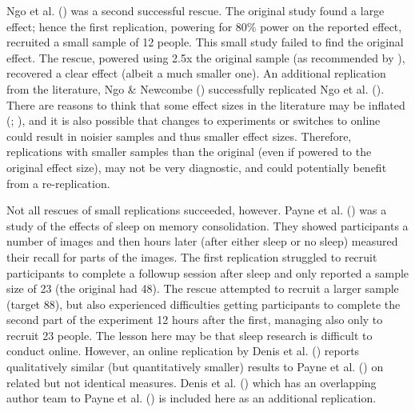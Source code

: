 \documentclass[
  english,
  a4paper,
]{article}
\begin{document}
Ngo et al. () was a second successful rescue.
The original study found a large effect; hence the first replication, powering for 80\% power on the reported effect, recruited a small sample of 12 people.
This small study failed to find the original effect.
The rescue, powered using 2.5x the original sample (as recommended by ), recovered a clear effect (albeit a much smaller one).
An additional replication from the literature, Ngo \& Newcombe () successfully replicated Ngo et al. ().
There are reasons to think that some effect sizes in the literature may be inflated (; ), and it is also possible that changes to experiments or switches to online could result in noisier samples and thus smaller effect sizes.
Therefore, replications with smaller samples than the original (even if powered to the original effect size), may not be very diagnostic, and could potentially benefit from a re-replication.

Not all rescues of small replications succeeded, however.
Payne et al. () was a study of the effects of sleep on memory consolidation.
They showed participants a number of images and then hours later (after either sleep or no sleep) measured their recall for parts of the images.
The first replication struggled to recruit participants to complete a followup session after sleep and only reported a sample size of 23 (the original had 48).
The rescue attempted to recruit a larger sample (target 88), but also experienced difficulties getting participants to complete the second part of the experiment 12 hours after the first, managing also only to recruit 23 people.
The lesson here may be that sleep research is difficult to conduct online.
However, an online replication by Denis et al. () reports qualitatively similar (but quantitatively smaller) results to Payne et al. () on related but not identical measures.
Denis et al. () which has an overlapping author team to Payne et al. () is included here as an additional replication.
\end{document}
